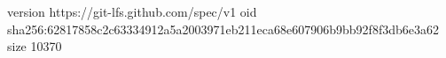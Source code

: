version https://git-lfs.github.com/spec/v1
oid sha256:62817858c2c63334912a5a2003971eb211eca68e607906b9bb92f8f3db6e3a62
size 10370
